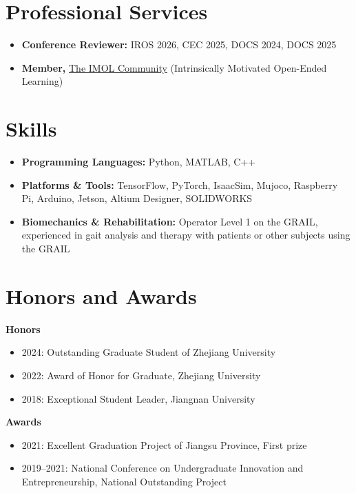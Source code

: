 \documentclass[a4paper,11pt]{article}
\newcommand{\resumeSubItem}[2]{\item \textbf{#1} #2}
\begin{document}
\section{\textbf{Professional Services}}
\small
\begin{itemize}[leftmargin=*,itemsep=0.8mm]
  \item \textbf{Conference Reviewer:} IROS 2026, CEC 2025, DOCS 2024, DOCS 2025
  \item \textbf{Member,} \href{https://www.imol-community.org/community/}{The IMOL Community} (Intrinsically Motivated Open-Ended Learning)
\end{itemize}
\vspace{1mm}
\normalsize

\section{\textbf{Skills}}
\begin{itemize}[leftmargin=*,itemsep=0.8mm]
  \resumeSubItem{Programming Languages:}{ Python, MATLAB, C++}
  \resumeSubItem{Platforms \& Tools:}{ TensorFlow, PyTorch, IsaacSim, Mujoco, Raspberry Pi, Arduino, Jetson, Altium Designer, SOLIDWORKS}
  \resumeSubItem{Biomechanics \& Rehabilitation:}{Operator Level 1 on the GRAIL, experienced in gait analysis and therapy with patients or other subjects using the GRAIL}
\end{itemize}
\vspace{-1mm}

\section{\textbf{Honors and Awards}}
\small
\textbf{Honors}
\begin{itemize}[leftmargin=*,itemsep=0.6mm]
  \item 2024: Outstanding Graduate Student of Zhejiang University
  \item 2022: Award of Honor for Graduate, Zhejiang University
  \item 2018: Exceptional Student Leader, Jiangnan University
\end{itemize}
\vspace{1mm}
\textbf{Awards}
\begin{itemize}[leftmargin=*,itemsep=0.6mm]
  \item 2021: Excellent Graduation Project of Jiangsu Province, First prize
  \item 2019--2021: National Conference on Undergraduate Innovation and Entrepreneurship, National Outstanding Project
\end{itemize}
\vspace{1mm}
\normalsize
\end{document}
